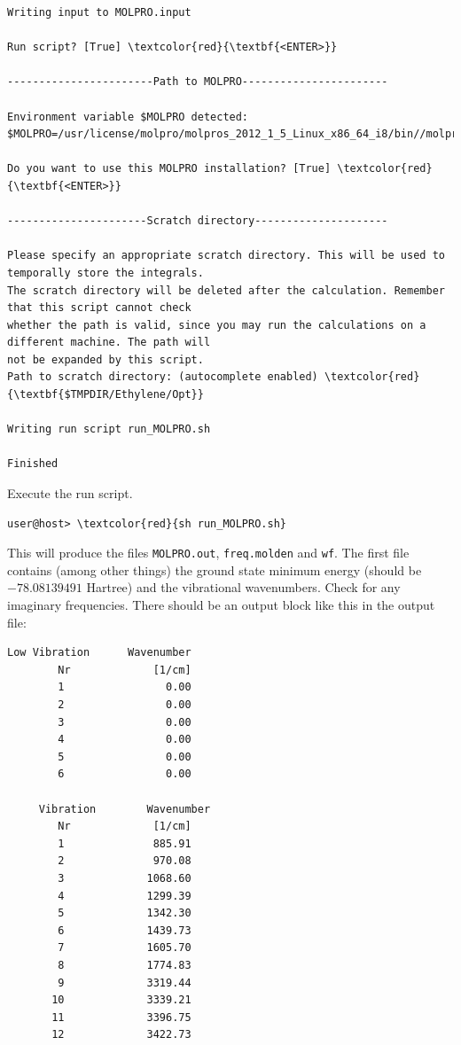 \documentclass[a4paper,11pt,DIV=15,openany]{scrbook}
\newcommand{\ttt}[1]{\texttt{#1}}
\begin{document}
\begin{oframed}
\begin{Verbatim}[commandchars=\\\{\}]
Writing input to MOLPRO.input

Run script? [True] \textcolor{red}{\textbf{<ENTER>}}

-----------------------Path to MOLPRO-----------------------

Environment variable $MOLPRO detected:
$MOLPRO=/usr/license/molpro/molpros_2012_1_5_Linux_x86_64_i8/bin//molpro

Do you want to use this MOLPRO installation? [True] \textcolor{red}{\textbf{<ENTER>}}

----------------------Scratch directory---------------------

Please specify an appropriate scratch directory. This will be used to temporally store the integrals. 
The scratch directory will be deleted after the calculation. Remember that this script cannot check 
whether the path is valid, since you may run the calculations on a different machine. The path will 
not be expanded by this script.
Path to scratch directory: (autocomplete enabled) \textcolor{red}{\textbf{$TMPDIR/Ethylene/Opt}}

Writing run script run_MOLPRO.sh

Finished
\end{Verbatim}
\end{oframed}

\normalsize

Execute the run script.
\begin{Verbatim}[commandchars=\\\{\}]
user@host> \textcolor{red}{sh run_MOLPRO.sh}
\end{Verbatim}
This will produce the files \ttt{MOLPRO.out}, \ttt{freq.molden} and \ttt{wf}. The first file contains (among other things) the ground state minimum energy (should be $-78.08139491$ Hartree) and the vibrational wavenumbers. Check for any imaginary frequencies. There should be an output block like this in the output file:
\begin{oframed}
\footnotesize\begin{Verbatim}[commandchars=\\\{\}]
   Low Vibration      Wavenumber
        Nr             [1/cm] 
        1                0.00
        2                0.00
        3                0.00
        4                0.00
        5                0.00
        6                0.00

     Vibration        Wavenumber
        Nr             [1/cm] 
        1              885.91
        2              970.08
        3             1068.60
        4             1299.39
        5             1342.30
        6             1439.73
        7             1605.70
        8             1774.83
        9             3319.44
       10             3339.21
       11             3396.75
       12             3422.73
\end{Verbatim}
\end{oframed}
\end{document}
